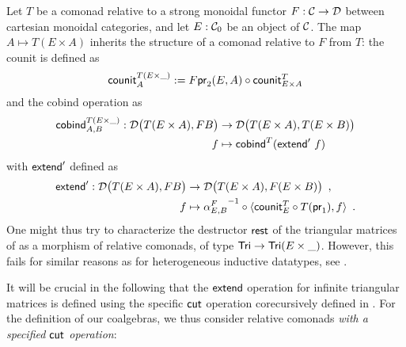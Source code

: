 \documentclass{amsart}
\begin{document}
\begin{remark}
  Let $T$ be a comonad relative to a strong monoidal functor $F:\C\to\D$ between cartesian monoidal categories,
  and let $E:\C_0$ be an object of $\C$.
 The map $A\mapsto T(E\times A)$ inherits the structure of a comonad relative to $F$ from $T$: the 
 counit is defined as
   \[ \counit^{T(E\times \_)}_A := \comp{\counit^T_{E\times A}}{F\pr_2(E,A)} \]
  and the cobind operation as
   \begin{align*} 
            \cobind^{T(E\times \_)}_{A,B} : \D\bigl(T(E\times A),FB\bigr) &\to \D\bigl(T(E\times A),T(E\times B)\bigr) \\
              f &\mapsto  \cobind^T(\extend'~f)
   \end{align*}
  with $\extend'$ defined as 
  \begin{align*} \extend' : \D\bigl(T(E\times A),FB\bigr) &\to \D\bigl(T(E\times A), F(E\times B)\bigr) \enspace , \\ 
                                            f & \mapsto \comp{\langle \comp{T(\pr_1)}{\counit^T_E}, f \rangle}{{\alpha^{F}_{E,B}}^{-1}} \enspace .
  \end{align*}
 One might thus try to characterize the destructor $\tail$ of the triangular matrices of 
 as a morphism of relative comonads, of type $\Tri \to \Tri(E\times \_)$.
 However, this fails for similar reasons as for heterogeneous inductive datatypes, see \parencite[Ex.\ 3.18]{ahrens_zsido}.
\end{remark}


It will be crucial in the following that the $\extend$ operation for infinite triangular matrices is defined using the specific
$\cut$ operation corecursively defined in . 
For the definition of our coalgebras, we thus consider relative comonads \emph{with a specified $\cut$ operation}:


\end{document}
